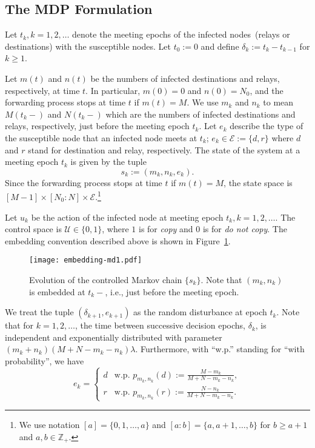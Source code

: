 \documentclass[10pt,journal,letterpaper]{IEEEtran}
\begin{document}
\subsection{The MDP Formulation}
\label{sec:mdp-formulation}
Let $t_k, k = 1,2,\dots$ denote the meeting epochs of the infected
nodes~(relays or destinations) with the susceptible nodes. Let $t_0 :=
0$ and define $\delta_k := t_k - t_{k-1}$ for $k \geq 1$.

Let $m(t)$ and $n(t)$ be the numbers of infected destinations and
relays, respectively, at time $t$. In particular, $m(0) = 0$ and
$n(0) = N_0$, and the forwarding process stops at time $t$ if $m(t)
= M$. We use $m_k$ and $n_k$ to mean $M(t_{k}-)$ and $N(t_{k}-)$ which are the numbers
of infected destinations and relays, respectively,  just before the meeting epoch $t_k$.
Let $e_k$ describe the type of the susceptible node
that an infected node meets at $t_k$; $e_k \in \mathcal{E} :=
\{d,r\}$ where $d$ and $r$ stand for destination and relay,
respectively. The state of the system at a meeting epoch $t_k$ is
given by the tuple
\begin{equation*}
s_k := (m_k, n_k, e_k).
\end{equation*}
Since the forwarding process stops at time $t$ if $m(t) = M$, the
state space is $[M-1] \times [N_0:N] \times
 \mathcal{E}$.\footnote{We use notation $[a] = \{0,1,\dots,a\}$ and $[a:b] = \{a,a+1,\dots,b\}$ for
$b \geq a+1$ and $a,b \in \mathbb{Z}_+$.}

Let $u_k$  be the action of the infected node at
meeting epoch $t_k, k = 1,2,\dots$.
The control space is
$\mathcal{U} \in \{0,1\}$, where $1$ is for {\it copy} and $0$ is for {\it do not copy}.
The embedding convention described
above is shown in Figure~\ref{embedding}.
\begin{figure}[t]{
\centering
\texttt{[image: embedding-md1.pdf]}
\caption{\label{embedding}Evolution of the controlled Markov chain
$\{s_k\}$. Note that $(m_k,n_k)$ is embedded at $t_k-$, i.e., just before the meeting epoch.}}
\end{figure}

We treat the tuple $(\delta_{k+1},e_{k+1})$ as the random
disturbance at epoch $t_k$. Note that for $k = 1,2,\dots$, the time
between successive decision epochs, $\delta_k$, is independent and
exponentially distributed with parameter
$(m_k+n_k)(M+N-m_k-n_k)\lambda$. Furthermore, with ``w.p.'' standing for ``with probability'', we have
\begin{equation*}
e_k = \begin{cases}
                 d  & \mbox{w.p. } p_{m_k,n_k}(d) := \frac{M-m_k}{M+N-m_k-n_k}, \\
                 r  & \mbox{w.p. } p_{m_k,n_k}(r) := \frac{N-n_k}{M+N-m_k-n_k}.\end{cases}
\end{equation*}
\end{document}
